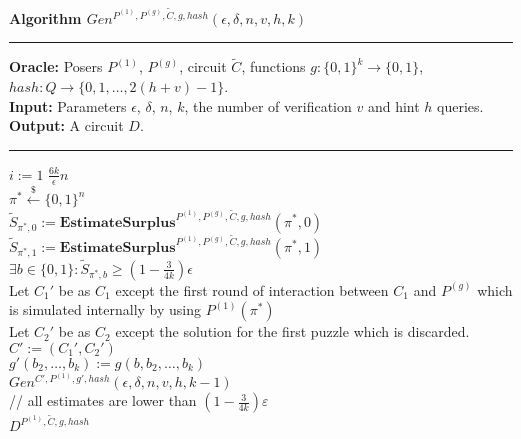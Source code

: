\begin{codeblock}
  \textbf{Algorithm $Gen^{P^{(1)}, P^{(g)}, \widetilde{C}, g, hash}(\epsilon, \delta, n, v, h, k)$}
  \medskip
  \hrule
  \medskip
  \textbf{Oracle:} Posers $P^{(1)}$, $P^{(g)}$, circuit $\widetilde{C}$, functions $g: \{0,1\}^{k} \rightarrow \{0,1\}$, \\
  \IndII  $hash:Q \rightarrow \{0,1, \dots, 2(h + v) - 1\}$. \\
  \textbf{Input:}  Parameters $\epsilon$, $\delta$, $n$, $k$, the number of verification $v$ and hint $h$ queries.\\
  \textbf{Output:} A circuit $D$.
  \medskip\hrule\medskip
  \For $i:=1$ \To $\frac{6k}{\epsilon}n$ \Do \\
  \IndI $\pi^* \xleftarrow{\$} \{0,1\}^{n}$\\
  \IndI $\widetilde{S}_{\pi^*,0} := \textbf{EstimateSurplus}^{P^{(1)}, P^{(g)}, \widetilde{C}, g, hash}(\pi^*, 0)$\\
  \IndI $\widetilde{S}_{\pi^*,1} := \textbf{EstimateSurplus}^{P^{(1)}, P^{(g)}, \widetilde{C}, g, hash}(\pi^*, 1)$\\
  \IndI \If $ \exists b \in \{0,1\}: \widetilde{S}_{\pi^*,b} \geq (1 - \frac{3}{4k}) \epsilon$ \Then \\
  \IndII Let $C_1'$ be as $C_1$ except the first round of interaction between $C_1$ and $P^{(g)}$ which \\
  \IndII is simulated internally by using $P^{(1)}(\pi^*)$\\
  \IndII Let $C_2'$ be as $C_2$ except the solution for the first puzzle which is discarded. \\
  \IndII $C' := (C_1', C_2')$ \\
  \IndII $g'(b_2, \dots, b_k) := g(b, b_2, \dots, b_k)$\\
  \IndII\Return $Gen^{C', P^{(1)}, g', hash}(\epsilon, \delta, n, v, h, k-1)$ \\
  // all estimates are lower than $(1-\frac{3}{4k})\varepsilon$\\
  \Return $D^{P^{(1)},\widetilde{C}, g, hash}$
\end{codeblock}

